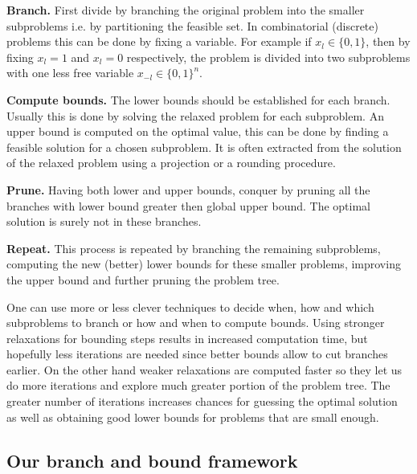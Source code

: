 \documentclass[12pt]{book}
\theoremstyle{definition}
\begin{document}
\textbf{Branch.} First divide by branching the original problem into the smaller subproblems i.e. by partitioning the feasible set. 
 In combinatorial (discrete) problems this can be done by fixing a variable. For example if $x_l \in \{0,1\}$, then by fixing $x_l=1$ and $x_l=0$ respectively, the problem is divided into two subproblems with one less free variable $x_{-l} \in \{0,1\}^n.$


\textbf{Compute bounds.} The lower bounds should be established for each branch. Usually this is done by solving the relaxed problem for each subproblem. 
An upper bound is computed on the optimal value, this can be done by finding a feasible solution for a chosen subproblem. It is often extracted from the solution of the relaxed problem using a projection or a rounding procedure.

\textbf{Prune.} Having both lower and upper bounds, conquer by pruning all the branches with lower bound greater then global upper bound. The optimal solution is surely not in these branches.

\textbf{Repeat.} This process is repeated by branching the remaining subproblems, computing the new (better) lower bounds for these smaller problems, improving the upper bound and further pruning the problem tree.

One can use more or less clever techniques to decide when, how and which subproblems to branch or how and when to compute bounds.
Using stronger relaxations for bounding steps results in increased computation time, but hopefully less iterations are needed since better bounds allow to cut branches earlier.  On the other hand weaker relaxations are computed faster so they let us do more iterations and explore much greater portion of the problem tree. The greater number of iterations increases chances for guessing the optimal solution as well as obtaining good lower bounds for problems that are small enough.

\subsection{Our branch and bound framework}
\end{document}
